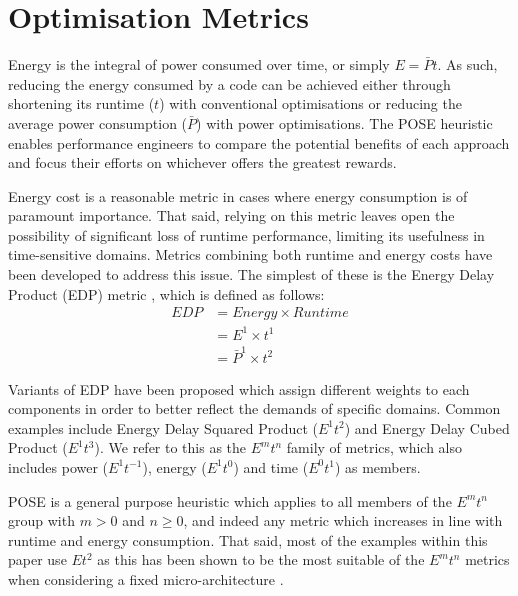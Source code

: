 \section{Optimisation Metrics}
\label{sec:metrics}

Energy is the integral of power consumed over time, or simply $E = \bar{P}t$.
As such, reducing the energy consumed by a code can be achieved either through shortening its runtime ($t$) with conventional optimisations or reducing the average power consumption ($\bar{P}$) with power optimisations.
The POSE heuristic enables performance engineers to compare the potential benefits of each approach and focus their efforts on whichever offers the greatest rewards.

Energy cost is a reasonable metric in cases where energy consumption is of paramount importance.
That said, relying on this metric leaves open the possibility of significant loss of runtime performance, limiting its usefulness in time-sensitive domains.
Metrics combining both runtime and energy costs have been developed to address this issue. 
The simplest of these is the Energy Delay Product (EDP) metric \cite{gonzales:1995aa}, which is defined as follows:
\begin{align}
  EDP &= Energy \times Runtime \nonumber \\
      &= E^1 \times t^1 \nonumber \\
      &= \bar{P}^1 \times t^2
  \label{eq:edp}
\end{align}

Variants of EDP have been proposed which assign different weights to each components in order to better reflect the demands of specific domains.
Common examples include Energy Delay Squared Product ($E^1t^{2}$) and Energy Delay Cubed Product ($E^1t^{3}$).
We refer to this as the $E^mt^n$ family of metrics, which also includes power ($E^1t^{-1}$), energy ($E^1t^0$) and time ($E^0t^1$) as members.

POSE is a general purpose heuristic which applies to all members of the $E^mt^n$ group with $m > 0$ and $n \geq 0$, and indeed any metric which increases in line with runtime and energy consumption.
That said, most of the examples within this paper use $Et^2$ as this has been shown to be the most suitable of the $E^mt^n$ metrics when considering a fixed micro-architecture \cite{brooks:2000aa}.
